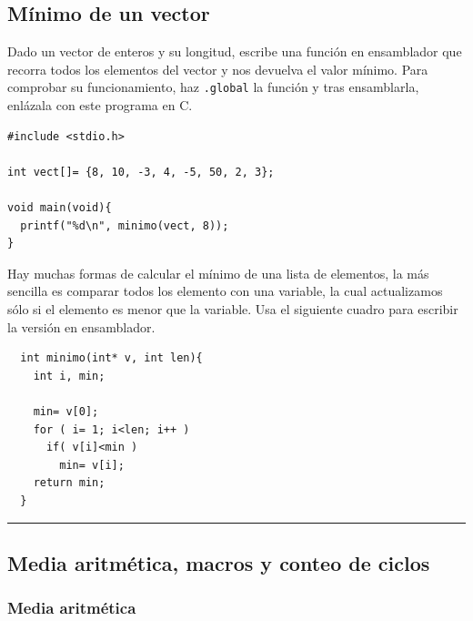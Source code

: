 \subsection{Mínimo de un vector}

Dado un vector de enteros y su longitud, escribe una función en ensamblador
que recorra todos los elementos del vector y nos devuelva el valor mínimo.
Para comprobar su funcionamiento, haz {\tt .global} la función y tras ensamblarla,
enlázala con este programa en C.

\begin{lstlisting}
#include <stdio.h>

int vect[]= {8, 10, -3, 4, -5, 50, 2, 3};

void main(void){
  printf("%d\n", minimo(vect, 8));
}
\end{lstlisting}

Hay muchas formas de calcular el mínimo de una lista de elementos, la más sencilla es
comparar todos los elemento con una variable, la cual actualizamos sólo si el elemento es
menor que la variable. Usa el siguiente cuadro para escribir la versión en ensamblador.

\begin{center}
\begin{myfbox}
\small
\begin{minipage}{0.92\linewidth}
\begin{center}
\begin{minipage}{0.6\linewidth}
\begin{verbatim}
  int minimo(int* v, int len){
    int i, min;

    min= v[0];
    for ( i= 1; i<len; i++ )
      if( v[i]<min )
        min= v[i];
    return min;
  }
\end{verbatim}
\end{minipage}
\end{center}
\begin{center}
\colorbox[gray]{1}{\rule{0cm}{7cm}\rule{11cm}{0cm}}
\end{center}
\end{minipage}
\end{myfbox}
\end{center}

\subsection{Media aritmética, macros y conteo de ciclos}

\subsubsection{Media aritmética}


